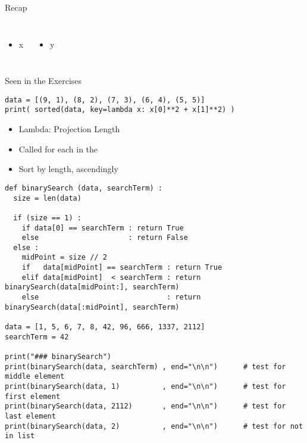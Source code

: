
\begin{frame}[fragile]{Recap}
%
\begin{columns}[T]
\begin{itemize}
\item x
\end{itemize}
%
\begin{itemize}
\item y
\end{itemize}
\end{columns}
%
\end{frame}

\begin{frame}[fragile]{Seen in the Exercises}
%
\begin{codebox}
\begin{verbatim}
data = [(9, 1), (8, 2), (7, 3), (6, 4), (5, 5)]
print( sorted(data, key=lambda x: x[0]**2 + x[1]**2) )
\end{verbatim}
\end{codebox}
%
\begin{itemize}
\item Lambda: Projection  \thus Length
\item Called for each  in the 
\item Sort by length, ascendingly 
\end{itemize}
%
\end{frame}


\begin{frame}[fragile]
%
\begin{codebox}
\begin{verbatim}
def binarySearch (data, searchTerm) :
  size = len(data)
  
  if (size == 1) :
    if data[0] == searchTerm : return True
    else                     : return False
  else :
    midPoint = size // 2
    if   data[midPoint] == searchTerm : return True
    elif data[midPoint]  < searchTerm : return binarySearch(data[midPoint:], searchTerm)
    else                              : return binarySearch(data[:midPoint], searchTerm)

data = [1, 5, 6, 7, 8, 42, 96, 666, 1337, 2112]
searchTerm = 42

print("### binarySearch")
print(binarySearch(data, searchTerm) , end="\n\n")      # test for middle element
print(binarySearch(data, 1)          , end="\n\n")      # test for first element
print(binarySearch(data, 2112)       , end="\n\n")      # test for last element
print(binarySearch(data, 2)          , end="\n\n")      # test for not in list
\end{verbatim}
\end{codebox}
%
\end{frame}


